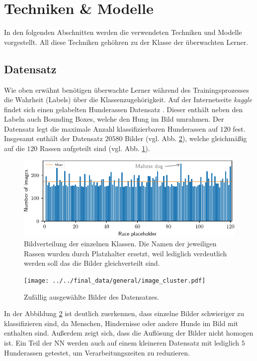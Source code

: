 \section{Techniken \& Modelle}
In den folgenden Abschnitten werden die verwendeten Techniken und Modelle
vorgestellt. All diese Techniken gehöhren zu der Klasse der überwachten
Lerner.
\subsection{Datensatz}
Wie oben erwähnt benötigen überwachte Lerner während des Trainingsprozesses
die Wahrheit (Labels) über die Klassenzugehörigkeit. Auf der Internetseite \emph{kaggle}
findet sich einen gelabelten
Hunderassen Datensatz \cite{datensatz}. Dieser enthält neben den Labeln auch
Bounding Boxes, welche den Hung im Bild umrahmen.
Der Datensatz legt die maximale Anzahl klassifizierbaren Hunderassen auf $120$ fest.
Insgesamt enthält der Datensatz $20580$ Bilder (vgl. Abb. \ref{fig:bilder_cluser}), welche gleichmäßig auf die $120$ Rassen aufgeteilt sind (vgl. Abb. \ref{fig:gleichverteilung_bilder}).
\begin{figure}
\centering
\includegraphics[width=\the\textwidth]{../../final_data/general/image_distribution.pdf}
\caption{Bildverteilung der einzelnen Klassen. Die Namen der jeweiligen Rassen
         wurden durch Platzhalter ersetzt, weil lediglich verdeutlich werden soll
         das die Bilder gleichverteilt sind.}
\label{fig:gleichverteilung_bilder}
\end{figure}
\begin{figure}
\centering
\texttt{[image: ../../final\_data/general/image\_cluster.pdf]}
\caption{Zufällig ausgewählte Bilder des Datensatzes.}
\label{fig:bilder_cluser}
\end{figure}
In der Abbildung \ref{fig:bilder_cluser} ist deutlich zuerkennen,
dass einzelne Bilder schwieriger zu klassifizieren sind,
da Menschen, Hindernisse oder andere Hunde im Bild mit enthalten sind. Außerdem
zeigt sich, dass die Auflösung der Bilder nicht homogen ist.
Ein Teil der NN werden auch auf einem kleineren Datensatz mit lediglich $5$ Hunderassen
getestet, um Verarbeitungszeiten zu reduzieren.

